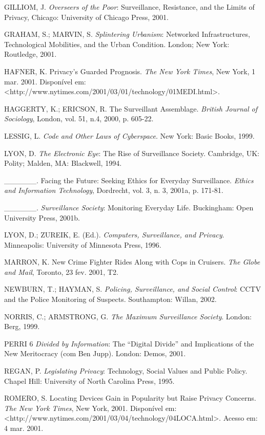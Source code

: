 GILLIOM, J. \emph{Overseers of the Poor}: Surveillance, Resistance, and
the Limits of Privacy, Chicago: University of Chicago Press, 2001.

GRAHAM, S.; MARVIN, S. \emph{Splintering Urbanism}: Networked
Infrastructures, Technological Mobilities, and the Urban Condition.
London; New York: Routledge, 2001.

HAFNER, K. Privacy's Guarded Prognosis. \emph{The New York Times}, New
York, 1 mar. 2001. Disponível em:
\textless{}http://www.nytimes.com/2001/03/01/technology/01MEDI.html\textgreater{}.

HAGGERTY, K.; ERICSON, R. The Surveillant Assemblage. \emph{British
Journal of Sociology}, London, vol. 51, n.4, 2000, p. 605-22.

LESSIG, L. \emph{Code and Other Laws of Cyberspace}. New York: Basic
Books, 1999.

LYON, D. \emph{The Electronic Eye}: The Rise of Surveillance Society.
Cambridge, UK: Polity; Malden, MA: Blackwell, 1994.

\_\_\_\_\_\_. Facing the Future: Seeking Ethics for Everyday
Surveillance. \emph{Ethics and Information Technology}, Dordrecht, vol.
3, n. 3, 2001a, p. 171-81.

\_\_\_\_\_\_. \emph{Surveillance Society}: Monitoring Everyday Life.
Buckingham: Open University Press, 2001b.

LYON, D.; ZUREIK, E. (Ed.). \emph{Computers, Surveillance, and Privacy}.
Minneapolis: University of Minnesota Press, 1996.

MARRON, K. New Crime Fighter Rides Along with Cops in Cruisers.
\emph{The Globe and Mail}, Toronto, 23 fev. 2001, T2.

NEWBURN, T.; HAYMAN, S. \emph{Policing, Surveillance, and Social
Control}: CCTV and the Police Monitoring of Suspects. Southampton:
Willan, 2002.

NORRIS, C.; ARMSTRONG, G. \emph{The Maximum Surveillance Society}.
London: Berg, 1999.

PERRI 6 \emph{Divided by Information}: The ``Digital Divide'' and
Implications of the New Meritocracy (com Ben Jupp). London: Demos, 2001.

REGAN, P. \emph{Legislating Privacy}: Technology, Social Values and
Public Policy. Chapel Hill: University of North Carolina Press, 1995.

ROMERO, S. Locating Devices Gain in Popularity but Raise Privacy
Concerns. \emph{The New York Times}, New York, 2001. Disponível em:
\textless{}http://www.nytimes.com/2001/03/04/technology/04LOCA.html\textgreater{}.
Acesso em: 4 mar. 2001.

